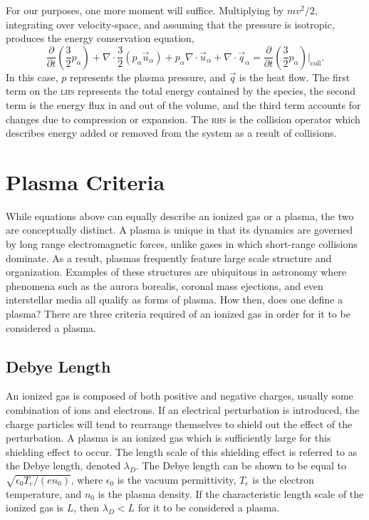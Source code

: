 For our purposes, one more moment will suffice. Multiplying by $mv^2/2$,
integrating over velocity-space, and assuming that the pressure is isotropic,
produces the energy conservation equation,
\begin{equation}
  \frac{\partial}{\partial t}\left(\frac{3}{2}p_\alpha\right) 
  + \nabla\cdot\frac{3}{2} (p_\alpha\vec{u}_\alpha)
  + p_\alpha\nabla\cdot\vec{u}_\alpha
  + \nabla\cdot\vec{q}_\alpha
  = \frac{\partial}{\partial
  t}\left(\frac{3}{2}p_\alpha\right)\bigg|_\mathrm{coll}.
\end{equation}
In this case, $p$ represents the plasma pressure, and $\vec{q}$ is the heat
flow. The first term on the \textsc{lhs} represents the total energy contained
by the species, the second term is the energy flux in and out of the volume, and
the third term accounts for changes due to compression or expansion. The
\textsc{rhs} is the collision operator which describes energy added or removed
from the system as a result of collisions.

\section{Plasma Criteria}
While equations above can equally describe an ionized gas or a plasma, the two
are conceptually distinct. A plasma is unique in that its dynamics are governed
by long range electromagnetic forces, unlike gases in which short-range
collisions dominate. As a result, plasmas frequently feature large scale
structure and organization. Examples of these structures are ubiquitous in
astronomy where phenomena such as the aurora borealis, coronal mass ejections,
and even interstellar media all qualify as forms of plasma. How then, does one
define a plasma? There are three criteria required of an ionized gas in order
for it to be considered a plasma.

\subsection{Debye Length}
An ionized gas is composed of both positive and negative charges, usually some
combination of ions and electrons. If an electrical perturbation is introduced,
the charge particles will tend to rearrange themselves to shield out the effect
of the perturbation. A plasma is an ionized gas which is sufficiently large for
this shielding effect to occur. The length scale of this shielding effect is
referred to as the Debye length, denoted $\lambda_D$. The Debye length can be
shown to be equal to $\sqrt{\epsilon_0T_e/(en_0)}$, where $\epsilon_0$ is the
vacuum permittivity, $T_e$ is the electron temperature, and $n_0$ is the plasma
density. If the characteristic length scale of the ionized gas is $L$, then
$\lambda_D < L$ for it to be considered a plasma.


